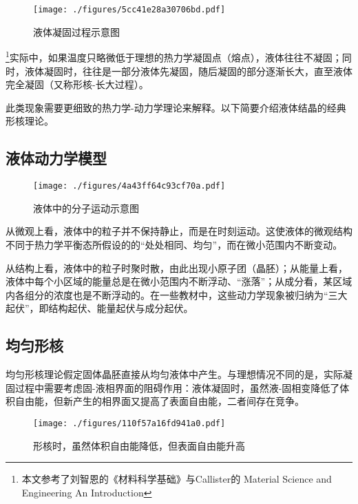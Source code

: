 
\begin{issues}
\issueDraft
{}
\end{issues}

\begin{figure}[ht]
\centering
\texttt{[image: ./figures/5cc41e28a30706bd.pdf]}
\caption{液体凝固过程示意图} \label{fig_NCLT_6}
\end{figure}
\footnote{本文参考了刘智恩的《材料科学基础》与Callister的 Material Science and Engineering An Introduction}实际中，如果温度只略微低于理想的热力学凝固点（熔点），液体往往不凝固；同时，液体凝固时，往往是一部分液体先凝固，随后凝固的部分逐渐长大，直至液体完全凝固（又称形核-长大过程）。

此类现象需要更细致的热力学-动力学理论来解释。以下简要介绍液体结晶的经典形核理论。

\subsection{液体动力学模型}
\begin{figure}[ht]
\centering
\texttt{[image: ./figures/4a43ff64c93cf70a.pdf]}
\caption{液体中的分子运动示意图} \label{fig_NCLT_5}
\end{figure}
从微观上看，液体中的粒子并不保持静止，而是在时刻运动。这使液体的微观结构不同于热力学平衡态所假设的的“处处相同、均匀”，而在微小范围内不断变动。

从结构上看，液体中的粒子时聚时散，由此出现小原子团（晶胚）；从能量上看，液体中每个小区域的能量总是在微小范围内不断浮动、“涨落”；从成分看，某区域内各组分的浓度也是不断浮动的。在一些教材中，这些动力学现象被归纳为“三大起伏”，即结构起伏、能量起伏与成分起伏。

\subsection{均匀形核}
均匀形核理论假定固体晶胚直接从均匀液体中产生。与理想情况不同的是，实际凝固过程中需要考虑固-液相界面的阻碍作用：液体凝固时，虽然液-固相变降低了体积自由能，但新产生的相界面又提高了表面自由能，二者间存在竞争。
\begin{figure}[ht]
\centering
\texttt{[image: ./figures/110f57a16fd941a0.pdf]}
\caption{形核时，虽然体积自由能降低，但表面自由能升高} \label{fig_NCLT_1}
\end{figure}

